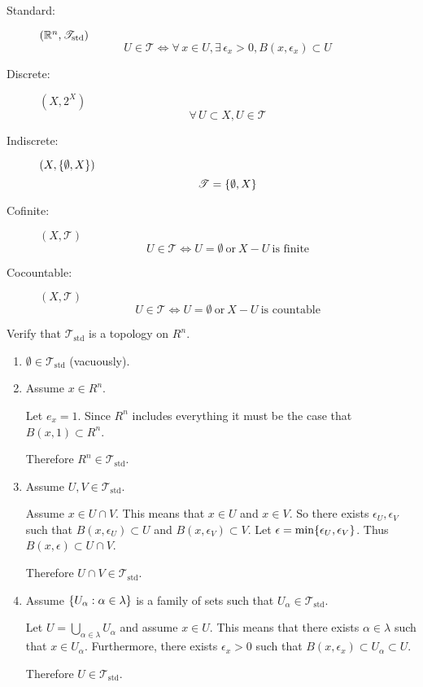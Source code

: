 \documentclass[letterpaper,12pt,fleqn]{article}
\newcommand{\T}{\mathscr{T}}
\renewcommand{\a}{\alpha}
\renewcommand{\l}{\lambda}
\newcommand{\e}{\epsilon}
\newcommand{\Tstd}{\T_{\text{std}}}
\begin{document}
\begin{definition}[Topologies]
  \begin{description}
  \item[]
  \item[Standard:] \((\R^n,\Tstd)\)
    \[U\in\T\iff\forall\,x\in U,\exists\,\e_x>0,B(x,\e_x)\subset U\]
  \item[Discrete:] \((X,2^X)\)
    \[\forall\,U\subset X,U\in\T\]
  \item[Indiscrete:] \((X,\{\emptyset,X\})\)
    \[\T=\set{\emptyset,X}\]
  \item[Cofinite:] \((X,\T)\)
    \[U\in\T\iff U=\emptyset\ \text{or}\ X-U\ \text{is finite}\]
  \item[Cocountable:] \((X,\T)\)
    \[U\in\T\iff U=\emptyset\ \text{or}\ X-U\ \text{is countable}\]
  \end{description}
\end{definition}

\begin{example}
  Verify that \(\Tstd\) is a topology on \(R^n\).

  \begin{enumerate}
  \item \(\emptyset\in\Tstd\) (vacuously).

  \item Assume \(x\in R^n\).

    Let \(e_x=1\).  Since \(R^n\) includes everything it must be the case that \(B(x,1)\subset R^n\).

    Therefore \(R^n\in\Tstd\).

  \item Assume \(U,V\in\Tstd\).

    Assume \(x\in U\cap V\).  This means that \(x\in U\) and \(x\in V\).  So there exists \(\e_U,\e_V\) such that
    \(B(x,\e_U)\subset U\) and \(B(x,\e_V)\subset V\).  Let \(\e=\min\set{\e_U,\e_V}\).  Thus
    \(B(x,\e)\subset U\cap V\).

    Therefore \(U\cap V\in\Tstd\).

  \item Assume \(\set{U_{\a}:\a\in\l}\) is a family of sets such that \(U_{\a}\in\Tstd\).

    Let \(U=\bigcup_{\a\in\l}U_{\a}\) and assume \(x\in U\).  This means that there exists \(\a\in\l\) such that
    \(x\in U_{\a}\).  Furthermore, there exists \(\e_x>0\) such that \(B(x,\e_x)\subset U_{\a}\subset U\).

    Therefore \(U\in\Tstd\).
  \end{enumerate}
\end{example}
\end{document}
